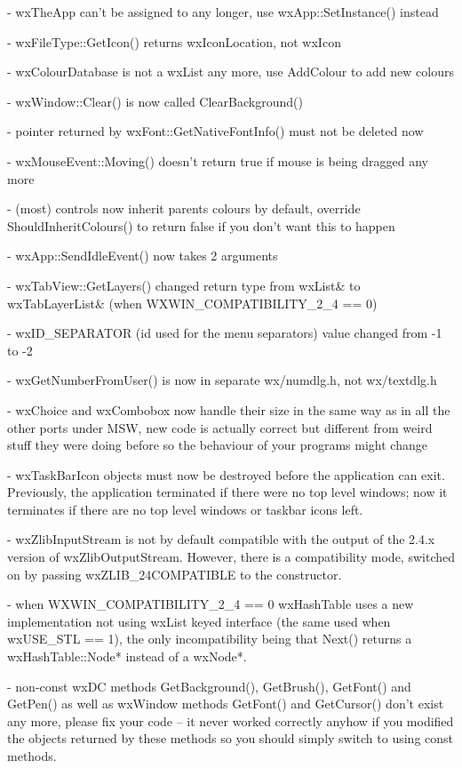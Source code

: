 - wxTheApp can't be assigned to any longer, use wxApp::SetInstance() instead

- wxFileType::GetIcon() returns wxIconLocation, not wxIcon

- wxColourDatabase is not a wxList any more, use AddColour to add new colours

- wxWindow::Clear() is now called ClearBackground()

- pointer returned by wxFont::GetNativeFontInfo() must not be deleted now

- wxMouseEvent::Moving() doesn't return true if mouse is being dragged any more

- (most) controls now inherit parents colours by default, override
  ShouldInheritColours() to return false if you don't want this to happen

- wxApp::SendIdleEvent() now takes 2 arguments

- wxTabView::GetLayers() changed return type from wxList& to wxTabLayerList&
  (when WXWIN\_COMPATIBILITY\_2\_4 == 0)

- wxID\_SEPARATOR (id used for the menu separators) value changed from -1 to -2

- wxGetNumberFromUser() is now in separate wx/numdlg.h, not wx/textdlg.h

- wxChoice and wxCombobox now handle their size in the same way as in all the
  other ports under MSW, new code is actually correct but different from weird
  stuff they were doing before so the behaviour of your programs might change

- wxTaskBarIcon objects must now be destroyed before the application can exit.
  Previously, the application terminated if there were no top level windows;
  now it terminates if there are no top level windows or taskbar icons left.

- wxZlibInputStream is not by default compatible with the output of the
  2.4.x version of wxZlibOutputStream. However, there is a compatibility mode,
  switched on by passing wxZLIB\_24COMPATIBLE to the constructor.

- when WXWIN\_COMPATIBILITY\_2\_4 == 0 wxHashTable uses a new implementation
  not using wxList keyed interface (the same used when wxUSE\_STL == 1),
  the only incompatibility being that Next() returns a wxHashTable::Node*
  instead of a wxNode*.

- non-const wxDC methods GetBackground(), GetBrush(), GetFont() and GetPen()
  as well as wxWindow methods GetFont() and GetCursor() don't exist any more,
  please fix your code -- it never worked correctly anyhow if you modified the
  objects returned by these methods so you should simply switch to using const
  methods.


